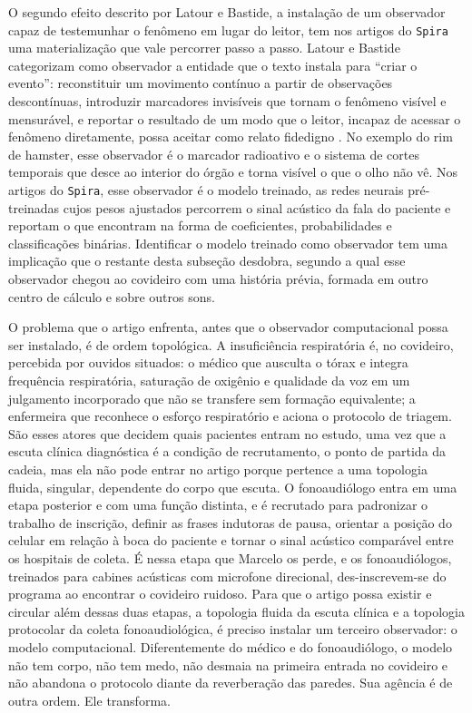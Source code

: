 O segundo efeito descrito por Latour e Bastide, a instalação de um observador capaz de testemunhar o fenômeno em lugar do leitor, tem nos artigos do \texttt{Spira} uma materialização que vale percorrer passo a passo. Latour e Bastide categorizam como observador a entidade que o texto instala para \enquote{criar o evento}: reconstituir um movimento contínuo a partir de observações descontínuas, introduzir marcadores invisíveis que tornam o fenômeno visível e mensurável, e reportar o resultado de um modo que o leitor, incapaz de acessar o fenômeno diretamente, possa aceitar como relato fidedigno \parencite[pp.~53--54]{Latour1986Writing}. No exemplo do rim de hamster, esse observador é o marcador radioativo e o sistema de cortes temporais que desce ao interior do órgão e torna visível o que o olho não vê. Nos artigos do \texttt{Spira}, esse observador é o modelo treinado, as redes neurais pré-treinadas cujos pesos ajustados percorrem o sinal acústico da fala do paciente e reportam o que encontram na forma de coeficientes, probabilidades e classificações binárias. Identificar o modelo treinado como observador tem uma implicação que o restante desta subseção desdobra, segundo a qual esse observador chegou ao covideiro com uma história prévia, formada em outro centro de cálculo e sobre outros sons.

O problema que o artigo enfrenta, antes que o observador computacional possa ser instalado, é de ordem topológica. A insuficiência respiratória é, no covideiro, percebida por ouvidos situados: o médico que ausculta o tórax e integra frequência respiratória, saturação de oxigênio e qualidade da voz em um julgamento incorporado que não se transfere sem formação equivalente; a enfermeira que reconhece o esforço respiratório e aciona o protocolo de triagem. São esses atores que decidem quais pacientes entram no estudo, uma vez que a escuta clínica diagnóstica é a condição de recrutamento, o ponto de partida da cadeia, mas ela não pode entrar no artigo porque pertence a uma topologia fluida, singular, dependente do corpo que escuta. O fonoaudiólogo entra em uma etapa posterior e com uma função distinta, e é recrutado para padronizar o trabalho de inscrição, definir as frases indutoras de pausa, orientar a posição do celular em relação à boca do paciente e tornar o sinal acústico comparável entre os hospitais de coleta. É nessa etapa que Marcelo os perde, e os fonoaudiólogos, treinados para cabines acústicas com microfone direcional, des-inscrevem-se do programa ao encontrar o covideiro ruidoso. Para que o artigo possa existir e circular além dessas duas etapas, a topologia fluida da escuta clínica e a topologia protocolar da coleta fonoaudiológica, é preciso instalar um terceiro observador: o modelo computacional. Diferentemente do médico e do fonoaudiólogo, o modelo não tem corpo, não tem medo, não desmaia na primeira entrada no covideiro e não abandona o protocolo diante da reverberação das paredes. Sua agência é de outra ordem. Ele transforma.

